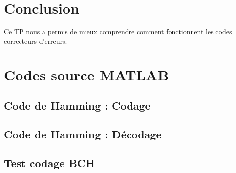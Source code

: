\documentclass[a4paper, 12pt]{article}
\newcommand{\FSource}[1]{%

}
\begin{document}








\newpage

\section{Conclusion}
Ce TP nous a permis de mieux comprendre comment fonctionnent les codes correcteurs d'erreurs.
\clearpage

%
%
\appendix

\section{Codes source MATLAB}

\subsection{Code de Hamming : Codage}\label{hamcode}

\FSource{../hamcode.m}

\newpage

\subsection{Code de Hamming : Décodage}\label{hamdecode}

\FSource{../hamdecode.m}

\newpage

\subsection{Test codage BCH}\label{bchtest}

\FSource{../bchtest.m}
\end{document}
